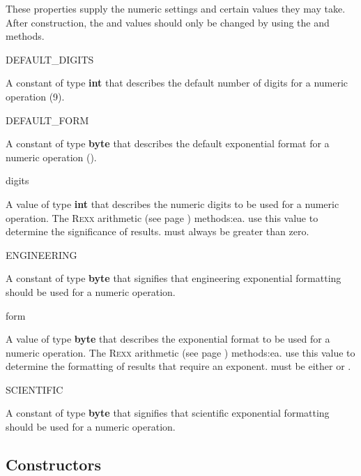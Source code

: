 These properties supply the numeric settings and certain values they may
take.  After construction, the  and  values
should only be changed by using the  and
 methods.
\begin{description}
\item{DEFAULT\_DIGITS}

A constant of type \textbf{int} that describes the default number of
digits for a numeric operation (9).
\item{DEFAULT\_FORM}

A constant of type \textbf{byte} that describes the default exponential
format for a numeric operation ().
\item{digits}

A value of type \textbf{int} that describes the numeric digits to be
used for a numeric operation.  The  R\textsc{exx} arithmetic (see page \pageref{refrexxops}) 
methods:ea. use this value to determine the significance of results.
 must always be greater than zero.
\item{ENGINEERING}

A constant of type \textbf{byte} that signifies that engineering
exponential formatting should be used for a numeric operation.
\item{form}

A value of type \textbf{byte} that describes the exponential format to
be used for a numeric operation.  The  R\textsc{exx} arithmetic (see page \pageref{refrexxops}) 
methods:ea. use this value to determine the formatting of results that
require an exponent.
 must be either  or .
\item{SCIENTIFIC}

A constant of type \textbf{byte} that signifies that scientific
exponential formatting should be used for a numeric operation.
\end{description}
\subsection{Constructors}\label{constructors}
 
